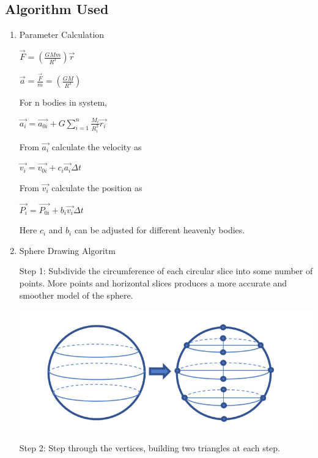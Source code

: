 \documentclass[12pt]{article}
\begin{document}
\subsection{Algorithm Used}
\begin{enumerate}
	\item Parameter Calculation
	
	\qquad$\vec{F} = (\frac{GMm}{R^{3}} )\vec{r}$
	
	\qquad$\vec{a} = \frac{\vec{F}}{m} = (\frac{GM}{R^{3}} )$
	
	For n bodies in system,
	
	\qquad$\vec{a_{i}} = \vec{a_{0i}} + G \sum_{i=1}^{n} \frac{M_{i}}{R_{i}^{3}} \vec{r_{i}} $	
	
	From $\vec{a_{i}}$ calculate the velocity as
	
	\qquad$\vec{v_{i}} = \vec{v_{0i}} + c_{i}\vec{a_{i}} \Delta t$
	
	From ${\vec{v_{i}}}$ calculate the position as
	
	\qquad$\vec{P_{i}} = \vec{P_{0i}} + b_{i} \vec{v_{i}} \Delta t$
	
	Here $c_{i}$ and $b_{i}$ can be adjusted for different heavenly bodies.
	
	\item Sphere Drawing Algoritm
	
	Step 1: Subdivide the circumference of each circular slice into some number of points. More points and horizontal slices produces a more accurate and smoother model of the sphere.
	
	\begin{center}
	\includegraphics[scale = 0.5]{sphere/1.png}
	\end{center}
\clearpage
	Step 2: Step through the vertices, building two triangles at each step.
	

\end{enumerate}
\end{document}
